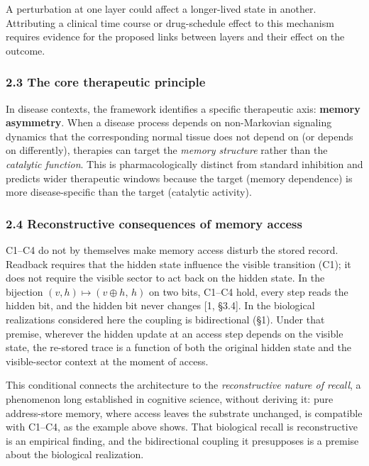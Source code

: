 \documentclass[
]{article}
\begin{document}
A perturbation at one layer could affect a longer-lived state in
another. Attributing a clinical time course or drug-schedule effect to
this mechanism requires evidence for the proposed links between layers
and their effect on the outcome.

\hypertarget{the-core-therapeutic-principle}{%
\subsubsection{2.3 The core therapeutic
principle}\label{the-core-therapeutic-principle}}

In disease contexts, the framework identifies a specific therapeutic
axis: \textbf{memory asymmetry}. When a disease process depends on
non-Markovian signaling dynamics that the corresponding normal tissue
does not depend on (or depends on differently), therapies can target the
\emph{memory structure} rather than the \emph{catalytic function}. This
is pharmacologically distinct from standard inhibition and predicts
wider therapeutic windows because the target (memory dependence) is more
disease-specific than the target (catalytic activity).

\hypertarget{reconstructive-consequences-of-memory-access}{%
\subsubsection{2.4 Reconstructive consequences of memory
access}\label{reconstructive-consequences-of-memory-access}}

C1--C4 do not by themselves make memory access disturb the stored
record. Readback requires that the hidden state influence the visible
transition (C1); it does not require the visible sector to act back on
the hidden state. In the bijection \((v,h)\mapsto(v\oplus h,\,h)\) on
two bits, C1--C4 hold, every step reads the hidden bit, and the hidden
bit never changes {[}1, §3.4{]}. In the biological realizations
considered here the coupling is bidirectional (§1). Under that premise,
wherever the hidden update at an access step depends on the visible
state, the re-stored trace is a function of both the original hidden
state and the visible-sector context at the moment of access.

This conditional connects the architecture to the \emph{reconstructive
nature of recall}, a phenomenon long established in cognitive science,
without deriving it: pure address-store memory, where access leaves the
substrate unchanged, is compatible with C1--C4, as the example above
shows. That biological recall is reconstructive is an empirical finding,
and the bidirectional coupling it presupposes is a premise about the
biological realization.
\end{document}
